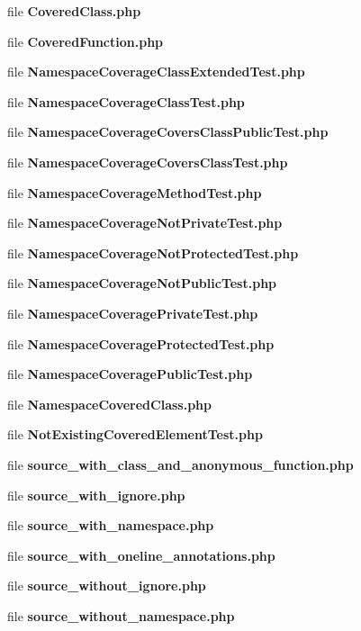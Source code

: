 \begin{DoxyCompactItemize}
file {\bf Covered\+Class.\+php}
\item 
file {\bf Covered\+Function.\+php}
\item 
file {\bf Namespace\+Coverage\+Class\+Extended\+Test.\+php}
\item 
file {\bf Namespace\+Coverage\+Class\+Test.\+php}
\item 
file {\bf Namespace\+Coverage\+Covers\+Class\+Public\+Test.\+php}
\item 
file {\bf Namespace\+Coverage\+Covers\+Class\+Test.\+php}
\item 
file {\bf Namespace\+Coverage\+Method\+Test.\+php}
\item 
file {\bf Namespace\+Coverage\+Not\+Private\+Test.\+php}
\item 
file {\bf Namespace\+Coverage\+Not\+Protected\+Test.\+php}
\item 
file {\bf Namespace\+Coverage\+Not\+Public\+Test.\+php}
\item 
file {\bf Namespace\+Coverage\+Private\+Test.\+php}
\item 
file {\bf Namespace\+Coverage\+Protected\+Test.\+php}
\item 
file {\bf Namespace\+Coverage\+Public\+Test.\+php}
\item 
file {\bf Namespace\+Covered\+Class.\+php}
\item 
file {\bf Not\+Existing\+Covered\+Element\+Test.\+php}
\item 
file {\bf source\+\_\+with\+\_\+class\+\_\+and\+\_\+anonymous\+\_\+function.\+php}
\item 
file {\bf source\+\_\+with\+\_\+ignore.\+php}
\item 
file {\bf source\+\_\+with\+\_\+namespace.\+php}
\item 
file {\bf source\+\_\+with\+\_\+oneline\+\_\+annotations.\+php}
\item 
file {\bf source\+\_\+without\+\_\+ignore.\+php}
\item 
file {\bf source\+\_\+without\+\_\+namespace.\+php}
\end{DoxyCompactItemize}
